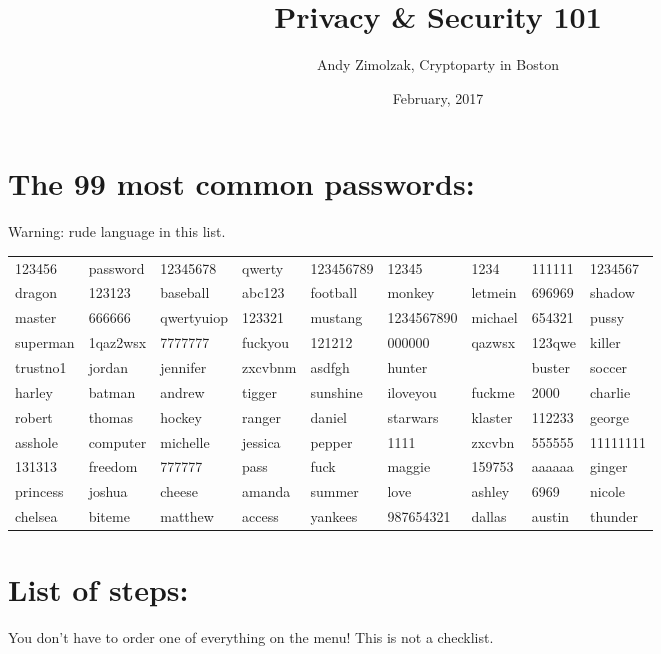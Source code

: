 \documentclass{tufte-handout}
\title{Privacy \& Security 101}
\author{Andy Zimolzak, Cryptoparty in Boston}
\date{February, 2017}
\begin{document}
\maketitle

\section{The 99 most common passwords:}

Warning: rude language in this list.

\begin{tabular}{lllllllll}

123456 & password & 12345678 & qwerty & 123456789 & 12345 & 1234 & 111111 & 1234567 \\
dragon & 123123 & baseball & abc123 & football & monkey & letmein & 696969 & shadow \\
master & 666666 & qwertyuiop & 123321 & mustang & 1234567890 & michael & 654321 & pussy \\
superman & 1qaz2wsx & 7777777 & fuckyou & 121212 & 000000 & qazwsx & 123qwe & killer \\
trustno1 & jordan & jennifer & zxcvbnm & asdfgh & hunter &  & buster & soccer \\
harley & batman & andrew & tigger & sunshine & iloveyou & fuckme & 2000 & charlie \\
robert & thomas & hockey & ranger & daniel & starwars & klaster & 112233 & george \\
asshole & computer & michelle & jessica & pepper & 1111 & zxcvbn & 555555 & 11111111 \\
131313 & freedom & 777777 & pass & fuck & maggie & 159753 & aaaaaa & ginger \\
princess & joshua & cheese & amanda & summer & love & ashley & 6969 & nicole \\
chelsea & biteme & matthew & access & yankees & 987654321 & dallas & austin & thunder \\
\end{tabular}

\section{List of steps:}

You don't have to order one of everything on the menu! This is not a
checklist.
\end{document}
